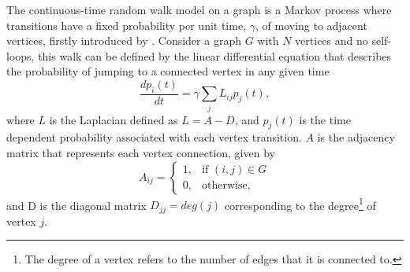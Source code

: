 \documentclass[../../dissertation.tex]{subfiles}
\begin{document}
The continuous-time random walk model on a graph is a Markov process where
transitions have a fixed probability per unit time, $\gamma$, of moving to
adjacent vertices, firstly introduced by \cite{montrollweiss1965}. Consider a
graph $G$ with $N$ vertices and no self-loops, this walk can be defined by the
linear differential equation that describes the probability of jumping to a
connected vertex in any given time 
\begin{equation}
	\frac{dp_i(t)}{dt} = \gamma \sum_j L_{ij} p_j(t), \label{eq:classicalContWalk}
\end{equation}
where $L$ is the Laplacian defined as $L = A - D$, and $p_j(t)$ is the time
dependent probability associated with each vertex transition. $A$ is the
adjacency matrix that represents each vertex connection, given by
\begin{equation}
	A_{ij} = \begin{cases} 1, & \mbox{if } (i,j)\in G \\ 0, & \mbox{otherwise,} \end{cases}
\end{equation}
and D is the diagonal matrix $D_{jj} = deg(j)$ corresponding to the
degree\footnote{The degree of a vertex refers to the number of edges that it is
connected to.} of vertex $j$.\par 
\end{document}
